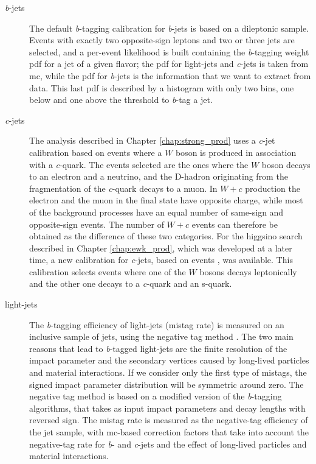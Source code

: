 \begin{description}

\item[\textit{b}-jets] The default \textit{b}-tagging calibration for \textit{b}-jets is based on a \ttbar dileptonic sample. Events with exactly two opposite-sign leptons
and two or three jets are selected, and a per-event likelihood is built containing the \textit{b}-tagging weight \gls{pdf} for a jet of a given flavor;
the \gls{pdf} for light-jets and \textit{c}-jets is taken from \gls{mc}, while the \gls{pdf} for \textit{b}-jets is the information that we want to extract from data.
This last \gls{pdf} is described by a histogram with only two bins, one below and one above the threshold to \textit{b}-tag a jet. 


\item[\textit{c}-jets] The analysis described in Chapter \ref{chap:strong_prod} uses a \textit{c}-jet calibration based on events where a $W$ boson 
is produced in association with a \textit{c}-quark. The events selected are the ones where the $W$ boson decays to an electron and a neutrino,
and the D-hadron originating from the fragmentation of the \textit{c}-quark decays to a muon. 
In $W+c$ production the electron and the muon in the final state have opposite charge, 
while most of the background processes have an equal number of same-sign and opposite-sign events. The number of $W+c$ events can therefore 
be obtained as the difference of these two categories.
For the higgsino search described in Chapter \ref{chap:ewk_prod}, which was developed at a later time, a new calibration for \textit{c}-jets, 
based on \ttbar events \cite{ATLAS-CONF-2018-001}, was available. 
This calibration selects \ttbar events where one of the $W$ bosons decays leptonically and the other one decays to a \textit{c}-quark and an s-quark. 

\item[light-jets] The \textit{b}-tagging efficiency of light-jets (mistag rate) is measured on an inclusive sample of jets, using the negative tag method 
\cite{ATLAS-CONF-2018-006}. 
The two main reasons that lead to \textit{b}-tagged light-jets are the finite resolution of the impact parameter and the secondary vertices caused
by long-lived particles and material interactions. If we consider only the first type of mistags, the signed impact parameter distribution 
will be symmetric around zero. 
The negative tag method is based on a modified version of the \textit{b}-tagging algorithms, that takes as input impact parameters and decay lengths with
reversed sign. The mistag rate is measured as the negative-tag efficiency of the jet sample, with \gls{mc}-based correction factors that take into account 
the negative-tag rate for \textit{b}- and \textit{c}-jets and the effect of long-lived particles and material interactions.

\end{description}

